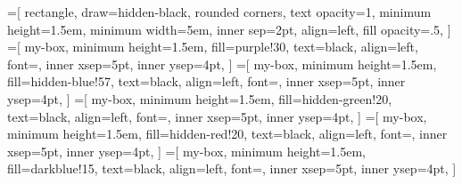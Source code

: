 =[
rectangle,
draw=hidden-black,
rounded corners,
text opacity=1,
minimum height=1.5em,
minimum width=5em,
inner sep=2pt,
align=left,
fill opacity=.5,
]
=[
my-box,
minimum height=1.5em,
fill=purple!30,
text=black,
align=left,
font=\normalsize,
inner xsep=5pt,
inner ysep=4pt,
]
=[
my-box,
minimum height=1.5em,
fill=hidden-blue!57,
text=black,
align=left,
font=\normalsize,
inner xsep=5pt,
inner ysep=4pt,
]
=[
my-box,
minimum height=1.5em,
fill=hidden-green!20,
text=black,
align=left,
font=\normalsize,
inner xsep=5pt,
inner ysep=4pt,
]
=[
my-box,
minimum height=1.5em,
fill=hidden-red!20,
text=black,
align=left,
font=\normalsize,
inner xsep=5pt,
inner ysep=4pt,
]
=[
my-box,
minimum height=1.5em,
fill=darkblue!15,
text=black,
align=left,
font=\normalsize,
inner xsep=5pt,
inner ysep=4pt,
]
